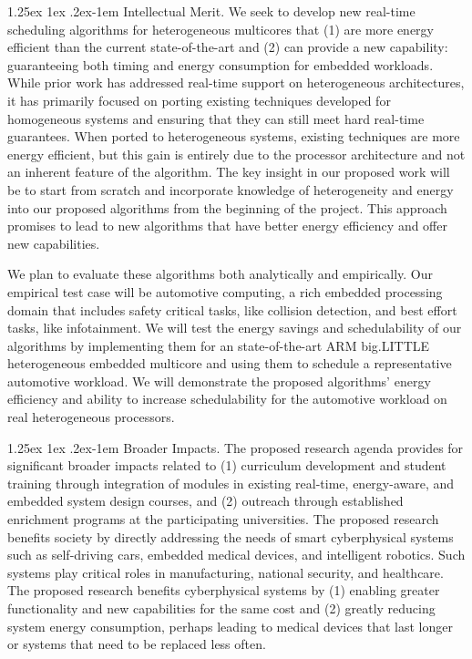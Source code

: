 \documentclass[10pt,letterpaper]{article}
\makeatletter
\renewcommand{\paragraph}{%
  \@startsection{paragraph}{4}%
  {\z@}{1.25ex \@plus 1ex \@minus .2ex}{-1em}%
  {\normalfont\normalsize\bfseries}%
}
\makeatother
\begin{document}
\paragraph{Intellectual Merit.} 
We seek to develop new real-time scheduling algorithms for
heterogeneous multicores that (1) are more energy efficient than the
current state-of-the-art and (2) can provide a new capability:
guaranteeing both timing and energy consumption for embedded
workloads.  While prior work has addressed real-time support on
heterogeneous architectures, it has primarily focused on porting
existing techniques developed for homogeneous systems and ensuring
that they can still meet hard real-time guarantees.  When ported to
heterogeneous systems, existing techniques are more energy efficient,
but this gain is entirely due to the processor architecture and not an
inherent feature of the algorithm.  The key insight in our proposed
work will be to start from scratch and incorporate knowledge of
heterogeneity and energy into our proposed algorithms from the
beginning of the project.  This approach promises to lead to new
algorithms that have better energy efficiency and offer new
capabilities.

We plan to evaluate these algorithms both analytically and
empirically.  Our empirical test case will be automotive computing, a
rich embedded processing domain that includes safety critical tasks,
like collision detection, and best effort tasks, like infotainment.  We
will test the energy savings and schedulability of our algorithms by
implementing them for an state-of-the-art ARM big.LITTLE heterogeneous
embedded multicore and using them to schedule a representative
automotive workload.  We will demonstrate the proposed algorithms'
energy efficiency and ability to increase schedulability for the
automotive workload on real heterogeneous processors.

\paragraph{Broader Impacts.}
The proposed research agenda provides for significant broader impacts
related to (1) curriculum development and student training through
integration of modules in existing real-time, energy-aware, and
embedded system design courses, and (2) outreach through established
enrichment programs at the participating universities. The proposed
research benefits society by directly addressing the needs of smart
cyberphysical systems such as self-driving cars, embedded medical
devices, and intelligent robotics.  Such systems play critical roles
in manufacturing, national security, and healthcare. The proposed
research benefits cyberphysical systems by (1) enabling greater
functionality and new capabilities for the same cost and (2) greatly
reducing system energy consumption, perhaps leading to medical devices
that last longer or systems that need to be replaced less often.
\end{document}

